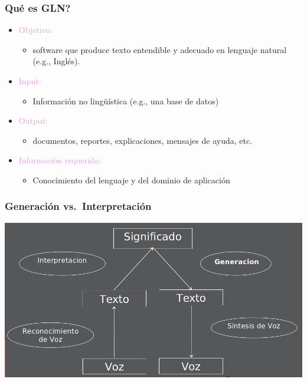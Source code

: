 \documentclass[compress,color=usenames]{beamer}
\newcommand{\mH}[1]{\textcolor{Plum}{#1}}
\begin{document}
\begin{frame}
\frametitle{Qu\'e es GLN?}

\begin{itemize}
\item  \mH{Objetivo: }

\begin{itemize}
\item software que produce texto entendible y adecuado en lenguaje natural (e.g., Ingl\'es).
\end{itemize}

\item  \mH{Input: }
\begin{itemize}
\item Informaci\'on no ling\"u\'istica (e.g., una base de datos)
\end{itemize}

\item  \mH{Output: }
\begin{itemize}
\item documentos, reportes, explicaciones, mensajes de ayuda, etc.
\end{itemize}

\item \mH{Informaci\'on requerida: }
\begin{itemize}
\item Conocimiento del lenguaje y del dominio de aplicaci\'on
\end{itemize}
\end{itemize}

\end{frame}

\begin{frame}
\frametitle{Generaci\'on vs.\ Interpretaci\'on}

\begin{center}
\includegraphics[scale=.4]{pics/pic1.jpg}
\end{center}
\end{frame}
\end{document}
